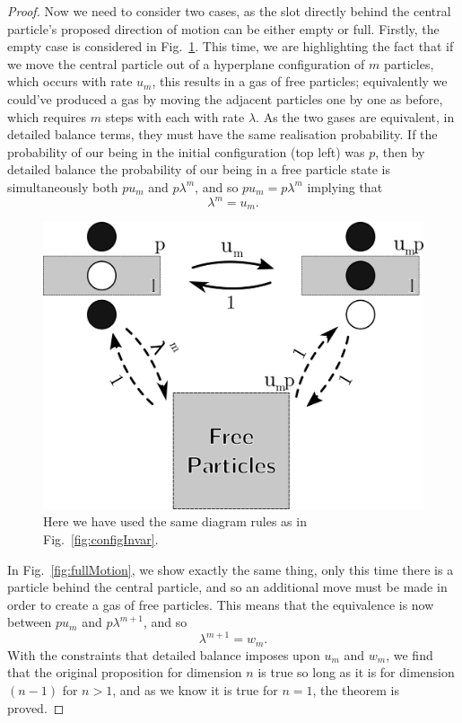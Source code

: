 \begin{proof}
Now we need to consider two cases, as the slot directly behind the central particle's proposed direction of motion can be either
empty or full. Firstly, the empty case is considered in Fig.~\ref{fig:emptyMotion}. This time, we are highlighting the fact that if we move the central particle out of a hyperplane configuration of $m$ particles, which occurs with rate $u_m$, this results in a gas of free particles;
 equivalently we could've produced a gas by moving the adjacent particles one by one as before, which requires $m$ steps with each with rate $\lambda$. As the two gases are equivalent, in detailed balance terms, they must have the same realisation probability. If the
 probability of our being in the initial configuration (top left) was $p$, then by detailed balance the probability of our being in
 a free particle state is simultaneously both $p u_m$ and $p \lambda^m$, and so
 $p u_m = p \lambda^m $ implying that
 \begin{equation}
  \lambda^m = u_m .
 \end{equation}
 
 \begin{figure}[h!]
 \caption[Figure demonstrating that particle motion out of a hyperplane with $m$ adjacent particles away from an empty space moves with rate $\lambda^m$.]{\label{fig:emptyMotion} 
 Here we have used the same diagram rules as in Fig.~\ref{fig:configInvar}. 
 }
  \begin{center}
 \includegraphics[width=0.66\linewidth]{analytics/images/ndDBuCycle}
  \end{center}
\end{figure}

In Fig.~\ref{fig:fullMotion}, we show exactly the same thing, only this time there is a particle behind the central particle, and so an
additional move must be made in order to create a gas of free particles. This means that the equivalence is now between $p u_m$ and
$p \lambda^{m+1}$, and so
 \begin{equation}
  \lambda^{m+1} = w_m .
 \end{equation}
 With the constraints that detailed balance imposes upon $u_m$ and $w_m$, we find that the original proposition for dimension $n$ is true so long as it is for dimension $(n-1)$ for $n>1$, and as we know it is true for $n=1$, the theorem is proved.


\end{proof}
